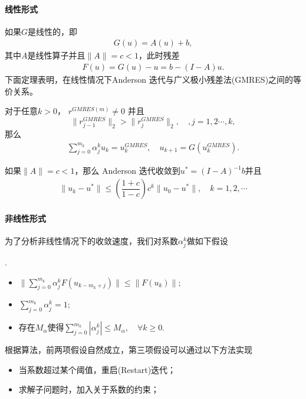 	\paragraph{线性形式} 如果$ G $是线性的，即
	\begin{align*}
	G(u) = A(u) + b ,
	\end{align*}
	其中$ A $是线性算子并且$ \|A\|=c<1 $，此时残差
	\begin{align*}
	F(u) = G(u) -u = b - (I-A)u.
	\end{align*}
	下面定理表明，在线性情况下Anderson 迭代与广义极小残差法(GMRES)之间的等价关系。
	\begin{theorem}
		对于任意$ k>0 $， $ r^{GMRES(m)} \neq 0$ 并且$$ \|r_{j-1}^{GMRES}\|_2> \|r_{j}^{GMRES}\|_2, \quad,j=1,2\cdots,k,$$ 那么
		\begin{align*}
		\sum_{j=0}^{m_k}\alpha^k_ju_k = u_k^{GMRES},\quad u_{k+1} = G(u_k^{GMRES}).
		\end{align*}
	\end{theorem}

	\begin{theorem}
		如果$ \|A\| = c<1 $，那么 Anderson 迭代收敛到$ u^* = (I-A)^{-1}b $并且
		\begin{align*}
		\|u_k - u^*\| \leq \left(\dfrac{1+c}{1-c}\right)c^k \|u_0 - u^*\|,\quad k = 1,2,\cdots
		\end{align*}
	\end{theorem}
    
	\paragraph{非线性形式} 
	为了分析非线性情况下的收敛速度，我们对系数$ \alpha_j^k $做如下假设
	\begin{assumption}.
		\label{assm:alpha}
		\begin{itemize}
			\item $ \|\sum_{j=0}^{m_k}\alpha_j^kF(u_{k-m_k+j})\| \leq \|F(u_k)\|; $
			\item $ \sum_{j=0}^{m_k}\alpha_j^k = 1; $
			\item 	存在$M_\alpha  $使得$
			\sum_{j=0}^{m_k}|\alpha_j^k| \leq M_\alpha,\quad \forall k\geq 0.$
		\end{itemize}		
	\end{assumption}
	根据算法，前两项假设自然成立，第三项假设可以通过以下方法实现
	\begin{itemize}
		\item 当系数超过某个阈值，重启(Restart)迭代；
		\item 求解子问题时，加入关于系数的约束；
	\end{itemize}

